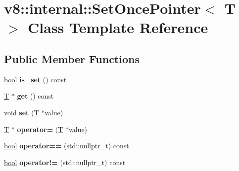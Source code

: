 \hypertarget{classv8_1_1internal_1_1SetOncePointer}{}\section{v8\+:\+:internal\+:\+:Set\+Once\+Pointer$<$ T $>$ Class Template Reference}
\label{classv8_1_1internal_1_1SetOncePointer}
\subsection*{Public Member Functions}
\begin{DoxyCompactItemize}
\item 
\mbox{\label{classv8_1_1internal_1_1SetOncePointer_ac6ac4a1e0e5a1e8e50c4cc63b59f012b}} 
\mbox{\hyperlink{classbool}{bool}} {\bfseries is\+\_\+set} () const
\item 
\mbox{\label{classv8_1_1internal_1_1SetOncePointer_ad6a1a132df7cad98be5323a1ce8fc441}} 
\mbox{\hyperlink{classv8_1_1internal_1_1torque_1_1T}{T}} $\ast$ {\bfseries get} () const
\item 
\mbox{\label{classv8_1_1internal_1_1SetOncePointer_a7ebb0e5532437fd52a91fd0c8ed60bd8}} 
void {\bfseries set} (\mbox{\hyperlink{classv8_1_1internal_1_1torque_1_1T}{T}} $\ast$value)
\item 
\mbox{\label{classv8_1_1internal_1_1SetOncePointer_a10b45fc2e77b7f8d8770612c25a6d30c}} 
\mbox{\hyperlink{classv8_1_1internal_1_1torque_1_1T}{T}} $\ast$ {\bfseries operator=} (\mbox{\hyperlink{classv8_1_1internal_1_1torque_1_1T}{T}} $\ast$value)
\item 
\mbox{\label{classv8_1_1internal_1_1SetOncePointer_a7fec9cde1f976ec9881617dd30320ca6}} 
\mbox{\hyperlink{classbool}{bool}} {\bfseries operator==} (std\+::nullptr\+\_\+t) const
\item 
\mbox{\label{classv8_1_1internal_1_1SetOncePointer_a79cda95cf59bd7f70daae379925e93c0}} 
\mbox{\hyperlink{classbool}{bool}} {\bfseries operator!=} (std\+::nullptr\+\_\+t) const
\end{DoxyCompactItemize}


